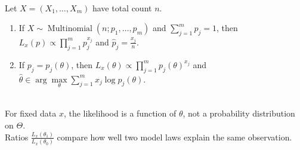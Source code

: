 \begin{example} \label{ex:multinomial-cell-probability-likelihood} \\
Let $X=(X_1,\ldots,X_m)$ have total count $n$.
\begin{enumerate}[label=(\roman*)]
\setlength{\itemsep}{0pt}
\item If $X\sim\operatorname{Multinomial}(n;p_1,\ldots,p_m)$ and $\sum\limits_{j=1}^{m}p_j=1$, then $L_x(p)\propto\prod\limits_{j=1}^{m}p_j^{x_j}$ and $\widehat{p}_j=\frac{x_j}{n}$.
\item If $p_j=p_j(\theta)$, then $L_x(\theta)\propto\prod\limits_{j=1}^{m}p_j(\theta)^{x_j}$ and $\widehat{\theta}\in\arg\max\limits_\theta\sum\limits_{j=1}^{m}x_j\log p_j(\theta)$.
\end{enumerate}
\end{example}

\begin{remark} \label{rem:likelihood-is-relative-evidence} \\
For fixed data $x$, the likelihood is a function of $\theta$, not a probability distribution on $\Theta$.\\
Ratios $\frac{L_x(\theta_1)}{L_x(\theta_0)}$ compare how well two model laws explain the same observation.
\end{remark}

